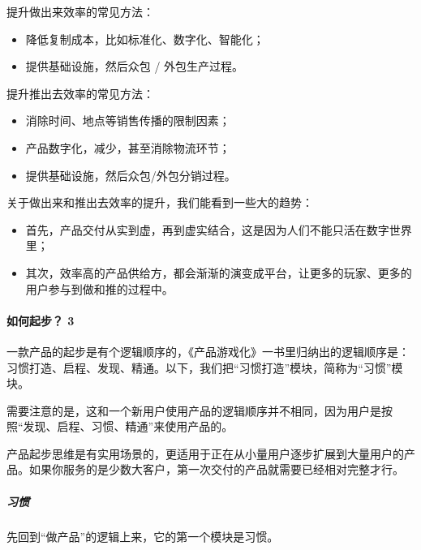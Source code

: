 \documentclass[letterpaper,10pt,english]{sphinxmanual}
\begin{document}
提升做出来效率的常见方法：
\begin{itemize}
\item {} 
降低复制成本，比如标准化、数字化、智能化；

\item {} 
提供基础设施，然后众包 / 外包生产过程。

\end{itemize}

提升推出去效率的常见方法：
\begin{itemize}
\item {} 
消除时间、地点等销售传播的限制因素；

\item {} 
产品数字化，减少，甚至消除物流环节；

\item {} 
提供基础设施，然后众包/外包分销过程。

\end{itemize}

关于做出来和推出去效率的提升，我们能看到一些大的趋势：
\begin{itemize}
\item {} 
首先，产品交付从实到虚，再到虚实结合，这是因为人们不能只活在数字世界里；

\item {} 
其次，效率高的产品供给方，都会渐渐的演变成平台，让更多的玩家、更多的用户参与到做和推的过程中。

\end{itemize}


\paragraph{如何起步？ 3\sphinxfootnotemark[47]}
\label{\detokenize{chapter_introduction/Product:id24}}%
\begin{footnotetext}[47]\sphinxAtStartFootnote
{}
%
\end{footnotetext}\ignorespaces 
一款产品的起步是有个逻辑顺序的，《产品游戏化》一书里归纳出的逻辑顺序是：习惯打造、启程、发现、精通。以下，我们把“习惯打造”模块，简称为“习惯”模块。

需要注意的是，这和一个新用户使用产品的逻辑顺序并不相同，因为用户是按照“发现、启程、习惯、精通”来使用产品的。

产品起步思维是有实用场景的，更适用于正在从小量用户逐步扩展到大量用户的产品。如果你服务的是少数大客户，第一次交付的产品就需要已经相对完整才行。


\subparagraph{习惯}
\label{\detokenize{chapter_introduction/Product:id25}}
先回到“做产品”的逻辑上来，它的第一个模块是习惯。
\end{document}
